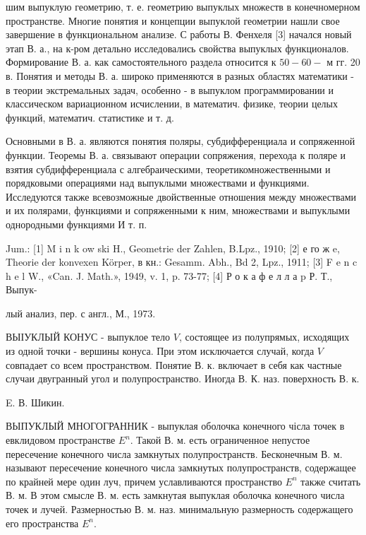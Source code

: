 \documentclass[10pt]{article}
\begin{document}
шим выпуклую геометрию, т. е. геометрию выпуклых множеств в конечномерном пространстве. Многие понятия и концепции выпуклой геометрии нашли свое завершение в функциональном анализе. С работы В. Фенхеля [3] начался новый этап В. а., на к-ром детально исследовались свойства выпуклых функционалов. Формирование В. а. как самостоятельного раздела относится к $50-60-$ м гг. 20 в. Понятия и методы В. а. широко применяются в разных областях математики - в теории экстремальных задач, особенно - в выпуклом программировании и классическом вариационном исчислении, в математич. физике, теории целых функций, математич. статистике и т. д.



Основными в В. а. являются понятия поляры, субдифференциала и сопряженной функции. Теоремы В. а. связывают операции сопряжения, перехода к поляре и взятия субдифференциала с алгебраическими, теоретикомножественными и порядковыми операциями над выпуклыми множествами и функциями. Исследуются также всевозможные двойственные отношения между множествами и их полярами, функциями и сопряженными к ним, множествами и выпуклыми однородными функциями И т. п.



Jum.: [1] M i n k ow ski H., Geometrie der Zahlen, B.Lpz., 1910; [2] е го ж e, Theorie der konvexen Körper, в кн.: Gesamm. Abh., Bd 2, Lpz., 1911; [3] F e n c h e l W., «Can. J. Math.», 1949, v. 1, p. 73-77; [4] Р о к а ф е л л а p Р. Т., Выпук-

лый анализ, пер. с англ., М., 1973.



ВЫІУКЛЫЙ КОНУС - выпуклое тело $V$, состоящее из полупрямых, исходящих из одной точки - вершины конуса. При этом исключается случай, когда $V$ совпадает со всем пространством. Понятие В. к. включает в себя как частные случаи двугранный угол и полупространство. Иногда В. К. наз. поверхность В. к.



E. В. Шикин.



ВЫПУКЛЫЙ МНОГОГРАННИК - выпуклая оболочка конечного чісла точек в евклидовом пространстве $E^{n}$. Такой В. м. есть ограниченное непустое пересечение конечного числа замкнутых полупространств. Бесконечным В. м. называют пересечение конечного числа замкнутых полупространств, содержащее по крайней мере один луч, причем уславливаются пространство $E^{n}$ также считать В. м. В этом смысле В. м. есть замкнутая выпуклая оболочка конечного числа точек и лучей. Размерностью В. м. наз. минимальную размерность содержащего его пространства $E^{n}$.
\end{document}
